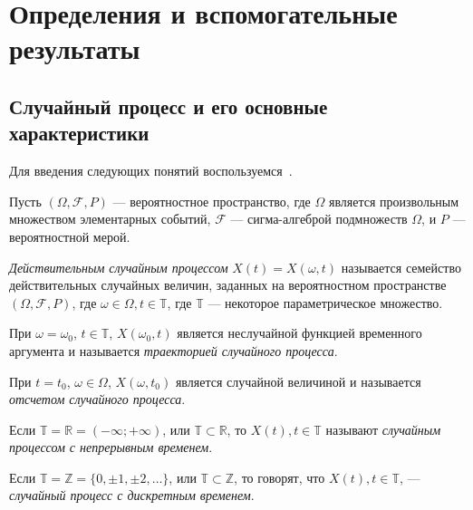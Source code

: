 
\newpage
\chapter{Определения и вспомогательные результаты}
\label{c:definitions}

\section{Случайный процесс и его основные характеристики}

Для введения следующих понятий воспользуемся~\cite{brillinjer-ts, trush-ts}.

Пусть $ (\Omega, \mathcal{F}, P) $ --- вероятностное пространство, где $\Omega$ является произвольным множеством элементарных событий, $\mathcal{F}$ --- сигма-алгеброй подмножеств $\Omega$, и $P$ --- вероятностной мерой.

\begin{Definition}
\label{def:stochastic-process}
	\textit{Действительным случайным процессом} $ X(t) = X(\omega, t) $ называется семейство действительных случайных величин, заданных на вероятностном пространстве $ (\Omega, \mathcal{F}, P) $, где $ \omega \in \Omega, t \in \mathbb{T}$, где $ \mathbb{T} $ --- некоторое параметрическое множество.

	При $ \omega = \omega_{0} $, $ t \in \mathbb{T} $, $ X(\omega_{0}, t) $ является неслучайной функцией временного аргумента и называется \textit{траекторией случайного процесса}.

	При $ t = t_{0} $, $ \omega \in \Omega $, $ X(\omega, t_{0}) $ является случайной величиной и называется \textit{отсчетом случайного процесса}.
\end{Definition}

\begin{Definition}%
    Если $ \mathbb{T} = \mathbb{R} = (- \infty; + \infty) $, или $ \mathbb{T} \subset \mathbb{R}$, то $ X(t), t \in \mathbb{T} $ называют \textit{случайным процессом с непрерывным временем}.
\end{Definition}

\begin{Definition}
	Если $ \mathbb{T} = \mathbb{Z} = \{ 0, \pm 1, \pm 2, \dots \} $, или $ \mathbb{T} \subset \mathbb{Z} $, то говорят, что $ X(t), t \in \mathbb{T} $, --- \textit{случайный процесс с дискретным временем}.
\end{Definition}

